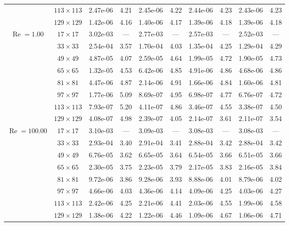 \documentclass[preprint, 12pt]{elsarticle}
\begin{document}
{\begin{center}
\begin{table}[H]
{\begin{tabular*}{\textwidth}{@{\extracolsep\fill}cccccccccc@{}}
    & $113\times 113$ & 2.47e-06 & 4.21 & 2.45e-06 & 4.22 & 2.44e-06 & 4.23 & 2.43e-06 & 4.23 \\
    & $129\times 129$ & 1.42e-06 & 4.16 & 1.40e-06 & 4.17 & 1.39e-06 & 4.18 & 1.39e-06 & 4.18 \\
    \hline\hline
    \multirow{7}{*}{$\operatorname{Re}=1.00$} & $17\times 17$ & 3.02e-03 & --- & 2.77e-03 & --- & 2.57e-03 & --- & 2.52e-03 & --- \\
    & $33\times 33$ & 2.54e-04 & 3.57 & 1.70e-04 & 4.03 & 1.35e-04 & 4.25 & 1.29e-04 & 4.29 \\
    & $49\times 49$ & 4.87e-05 & 4.07 & 2.59e-05 & 4.64 & 1.99e-05 & 4.72 & 1.90e-05 & 4.73 \\
    \multirow{3}{*}{$\operatorname{Wi}=10$} & $65\times 65$ & 1.32e-05 & 4.53 & 6.42e-06 & 4.85 & 4.91e-06 & 4.86 & 4.68e-06 & 4.86 \\
    & $81\times 81$ & 4.47e-06 & 4.87 & 2.14e-06 & 4.91 & 1.66e-06 & 4.84 & 1.60e-06 & 4.81 \\
    & $97\times 97$ & 1.77e-06 & 5.09 & 8.69e-07 & 4.95 & 6.98e-07 & 4.77 & 6.76e-07 & 4.72 \\
    & $113\times 113$ & 7.93e-07 & 5.20 & 4.11e-07 & 4.86 & 3.46e-07 & 4.55 & 3.38e-07 & 4.50 \\
    & $129\times 129$ & 4.08e-07 & 4.98 & 2.39e-07 & 4.05 & 2.14e-07 & 3.61 & 2.11e-07 & 3.54 \\
    \hline
    \multirow{7}{*}{$\operatorname{Re}=100.00$} & $17\times 17$ & 3.10e-03 & --- & 3.09e-03 & --- & 3.08e-03 & --- & 3.08e-03 & --- \\
    & $33\times 33$ & 2.93e-04 & 3.40 & 2.91e-04 & 3.41 & 2.88e-04 & 3.42 & 2.88e-04 & 3.42 \\
    & $49\times 49$ & 6.76e-05 & 3.62 & 6.65e-05 & 3.64 & 6.54e-05 & 3.66 & 6.51e-05 & 3.66 \\
    \multirow{3}{*}{$\operatorname{Wi}=10$} & $65\times 65$ & 2.30e-05 & 3.75 & 2.23e-05 & 3.79 & 2.17e-05 & 3.83 & 2.16e-05 & 3.84 \\
    & $81\times 81$ & 9.72e-06 & 3.86 & 9.28e-06 & 3.93 & 8.88e-06 & 4.01 & 8.79e-06 & 4.02 \\
    & $97\times 97$ & 4.66e-06 & 4.03 & 4.36e-06 & 4.14 & 4.09e-06 & 4.25 & 4.03e-06 & 4.27 \\
    & $113\times 113$ & 2.42e-06 & 4.25 & 2.21e-06 & 4.41 & 2.03e-06 & 4.55 & 1.99e-06 & 4.58 \\
    & $129\times 129$ & 1.38e-06 & 4.22 & 1.22e-06 & 4.46 & 1.09e-06 & 4.67 & 1.06e-06 & 4.71 \\

\end{tabular*}}
\end{table}
\end{center}}
\end{document}
